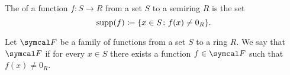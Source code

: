 \begin{definition}\label{def:function_support}
  The  of a function \( f: S \to R \) from a set \( S \) to a semiring \( R \) is the set
  \begin{equation*}
    \operatorname{supp}(f) \coloneqq \{ x \in S \colon f(x) \neq 0_R \}.
  \end{equation*}
\end{definition}

\begin{definition}\label{def:functions_vanish_nowhere}
  Let \( \Cal{F} \) be a family of functions from a set \( S \) to a ring \( R \). We say that \( \Cal{F} \)  if for every \( x \in S \) there exists a function \( f \in \Cal{F} \) such that \( f(x) \neq 0_R \).
\end{definition}
